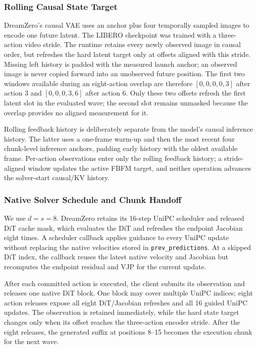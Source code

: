 \subsubsection{Rolling Causal State Target}

DreamZero's causal VAE uses an anchor plus four temporally sampled images to
encode one future latent. The LIBERO checkpoint was trained with a three-action
video stride. The runtime retains every newly observed image in causal order,
but refreshes the hard latent target only at offsets aligned with this stride.
Missing left history is padded with the measured launch anchor; an observed
image is never copied forward into an unobserved future position. The first two
windows available during an eight-action overlap are therefore
$[0,0,0,0,3]$ after action 3 and $[0,0,0,3,6]$ after action 6. Only these two
offsets refresh the first latent slot in the evaluated wave; the second slot
remains unmasked because the overlap provides no aligned measurement for it.

Rolling feedback history is deliberately separate from the model's causal
inference history. The latter uses a one-frame warm-up and then the most recent
four chunk-level inference anchors, padding early history with the oldest
available frame. Per-action observations enter only the rolling feedback
history; a stride-aligned window updates the active FBFM target, and neither
operation advances the solver-start causal/KV history.

\subsubsection{Native Solver Schedule and Chunk Handoff}

We use $d=s=8$. DreamZero retains its 16-step UniPC scheduler and released DiT
cache mask, which evaluates the DiT and refreshes the endpoint Jacobian eight
times. A scheduler callback applies guidance to every UniPC update without
replacing the native velocities stored in \texttt{prev\_predictions}. At a
skipped DiT index, the callback reuses the latest native velocity and Jacobian
but recomputes the endpoint residual and VJP for the current update.

After each committed action is executed, the client submits its observation
and releases one native DiT block. One block may cover multiple UniPC indices;
eight action releases expose all eight DiT/Jacobian refreshes and all 16 guided
UniPC updates. The observation is retained immediately, while the hard state
target changes only when its offset reaches the three-action encoder stride.
After the eight releases, the generated suffix at positions 8--15 becomes the
execution chunk for the next wave.

